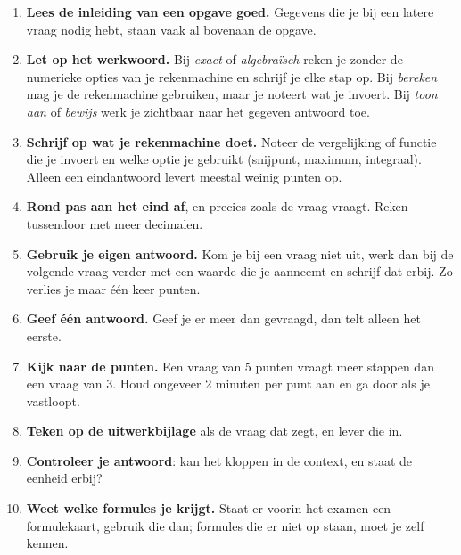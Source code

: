 {\small\opmaakproza
\begin{enumerate}[leftmargin=1.5em,itemsep=3pt,label=\textcolor{kleur1}{\sffamily\bfseries\arabic*}]
\item \textbf{Lees de inleiding van een opgave goed.} Gegevens die je bij een latere vraag nodig hebt, staan vaak
  al bovenaan de opgave.
\item \textbf{Let op het werkwoord.} Bij \emph{exact} of \emph{algebra\"isch} reken je zonder de numerieke opties van je
  rekenmachine en schrijf je elke stap op. Bij \emph{bereken} mag je de rekenmachine gebruiken, maar je noteert wat je
  invoert. Bij \emph{toon aan} of \emph{bewijs} werk je zichtbaar naar het gegeven antwoord toe.
\item \textbf{Schrijf op wat je rekenmachine doet.} Noteer de vergelijking of functie die je invoert en welke optie je
  gebruikt (snijpunt, maximum, integraal). Alleen een eindantwoord levert meestal weinig punten op.
\item \textbf{Rond pas aan het eind af}, en precies zoals de vraag vraagt. Reken tussendoor met meer decimalen.
\item \textbf{Gebruik je eigen antwoord.} Kom je bij een vraag niet uit, werk dan bij de volgende vraag verder met een waarde
  die je aanneemt en schrijf dat erbij. Zo verlies je maar \'e\'en keer punten.
\item \textbf{Geef \'e\'en antwoord.} Geef je er meer dan gevraagd, dan telt alleen het eerste.
\item \textbf{Kijk naar de punten.} Een vraag van 5 punten vraagt meer stappen dan een vraag van 3. Houd ongeveer
  2 minuten per punt aan en ga door als je vastloopt.
\item \textbf{Teken op de uitwerkbijlage} als de vraag dat zegt, en lever die in.
\item \textbf{Controleer je antwoord}: kan het kloppen in de context, en staat de eenheid erbij?
\item \textbf{Weet welke formules je krijgt.} Staat er voorin het examen een formulekaart, gebruik die dan;
  formules die er niet op staan, moet je zelf kennen.
\end{enumerate}\par}
